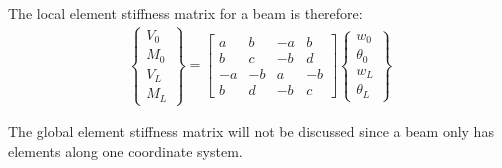 The local element stiffness matrix for a beam is therefore:
\begin{align}
	\begin{Bmatrix}
		V_0\\ M_0\\ \hline V_L\\ M_L
	\end{Bmatrix}
	=
	\left[
	\begin{array}{cc|cc}
		a & b & -a & b\\
		b & c & -b & d\\ \hline
		-a & -b & a & -b\\
		b & d & -b & c
	\end{array}
	\right]
	\begin{Bmatrix}
		w_0\\ \theta_0\\ \hline w_L\\ \theta_L
	\end{Bmatrix}
\end{align}

The global element stiffness matrix will not be discussed since a beam only has elements along one coordinate system. 